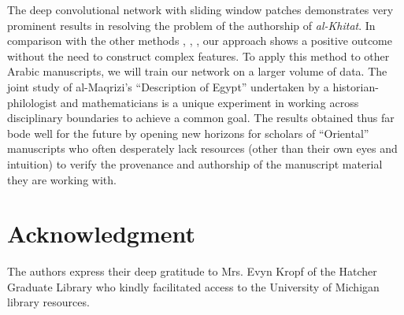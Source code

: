 \documentclass[conference,a4paper]{ieeetran}
\begin{document}
The deep convolutional network with sliding window patches demonstrates very prominent results in resolving the problem of the authorship of {\it al-Khitat}. In comparison with the other methods \cite{MBulacu}, \cite{MBulacu1}, \cite{DFecker}, \cite{Salvador} our approach shows a positive outcome without the need to construct complex features. To apply this method to other Arabic manuscripts, we will train our network on a larger volume of data. The joint study of al-Maqrizi's ``Description of Egypt'' undertaken by a historian-philologist and mathematicians is a unique experiment in working across disciplinary boundaries to achieve a common goal. The results obtained thus far bode well for the future by opening new horizons for scholars of ``Oriental'' manuscripts who often desperately lack resources (other than their own eyes and intuition) to verify the provenance and authorship of the manuscript material they are working with.

\section*{Acknowledgment}
The authors express their deep gratitude to Mrs. Evyn Kropf of the Hatcher Graduate Library who kindly facilitated access to the University of Michigan library resources.
 
\end{document}
